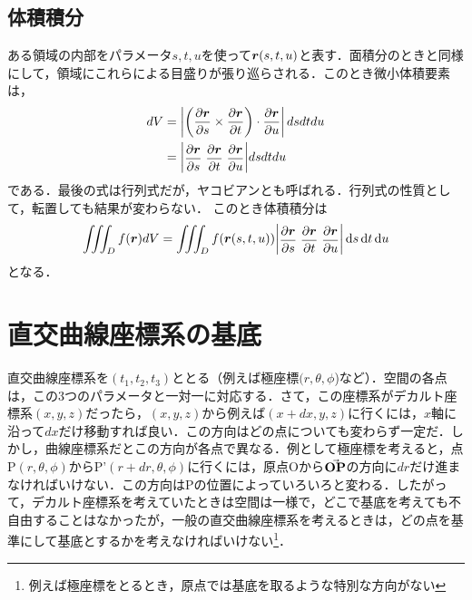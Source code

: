 \documentclass[a4paper,10pt,uplatex]{jsarticle}
\newcommand{\ds}{\displaystyle}
\begin{document}
\subsection{体積積分}
ある領域の内部をパラメータ$s,t,u$を使って$\vb*{r}(s,t,u)$と表す．面積分のときと同様にして，領域にこれらによる目盛りが張り巡らされる．このとき微小体積要素は，
\begin{align}
    dV &= \left| \left(\pdv{\vb*{r}}{s} \times \pdv{\vb*{r}}{t}\right) \cdot \pdv{\vb*{r}}{u} \right| dsdtdu \\
    &= \mqty| \ds \pdv{\vb*{r}}{s} \; \pdv{\vb*{r}}{t} \; \pdv{\vb*{r}}{u} | dsdtdu
\end{align}
である．最後の式は行列式だが，ヤコビアンとも呼ばれる．行列式の性質として，転置しても結果が変わらない．
このとき体積積分は
\begin{equation}
    \iiint_D f(\vb*{r}) dV = \iiint_D f(\vb*{r}(s,t,u)) \mqty| \ds \pdv{\vb*{r}}{s} \; \pdv{\vb*{r}}{t} \; \pdv{\vb*{r}}{u} | \dd{s}\dd{t}\dd{u}
\end{equation}
となる．

\section{直交曲線座標系の基底}
直交曲線座標系を$(t_1, t_2, t_3)$ととる（例えば極座標$(r,\theta,\phi$)など）．空間の各点は，この3つのパラメータと一対一に対応する．さて，この座標系がデカルト座標系$(x,y,z)$だったら，$(x,y,z)$から例えば$(x+dx,y,z)$に行くには，$x$軸に沿って$dx$だけ移動すれば良い．この方向はどの点についても変わらず一定だ．しかし，曲線座標系だとこの方向が各点で異なる．例として極座標を考えると，点P$(r,\theta,\phi)$からP'$(r+dr,\theta,\phi)$に行くには，原点Oから$\va{OP}$の方向に$dr$だけ進まなければいけない．この方向はPの位置によっていろいろと変わる．したがって，デカルト座標系を考えていたときは空間は一様で，どこで基底を考えても不自由することはなかったが，一般の直交曲線座標系を考えるときは，どの点を基準にして基底とするかを考えなければいけない\footnote{例えば極座標をとるとき，原点では基底を取るような特別な方向がない}．
\end{document}
